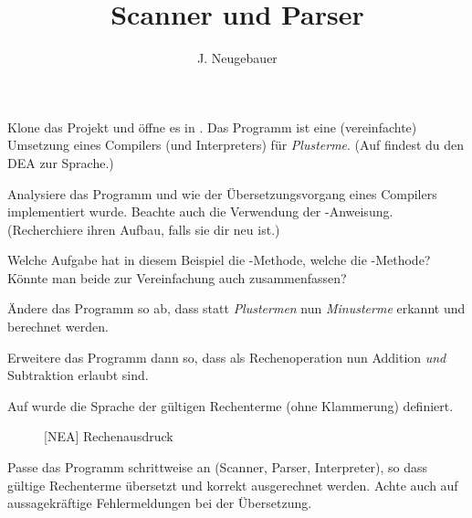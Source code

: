 \documentclass[10pt, a4paper]{scrartcl}
\author{J. Neugebauer}
\title{Scanner und Parser}
\date{\Heute}
\begin{document}
\ReiheTitel

\begin{aufgabe}[subtitle=Funktionsweise eines Compilers]
	\label{aufg:compiler}
	Klone das Projekt  und öffne es in .
	Das Programm ist eine (vereinfachte) Umsetzung eines Compilers (und Interpreters) für
	\emph{Plusterme}. (Auf  findest du den DEA zur Sprache.)

	Analysiere das Programm und wie der Übersetzungsvorgang eines Compilers
	implementiert wurde. Beachte auch die Verwendung der -Anweisung. (Recherchiere
	ihren Aufbau, falls sie dir neu ist.)

	Welche Aufgabe hat in diesem Beispiel die -Methode, welche die -Methode?
	Könnte man beide zur Vereinfachung auch zusammenfassen?

\end{aufgabe}

\begin{aufgabe}[subtitle=Minusterme]
	\label{aufg:subtraktion}
	Ändere das Programm so ab, dass statt \emph{Plustermen} nun \emph{Minusterme} erkannt und
	berechnet werden.

	Erweitere das Programm dann so, dass als Rechenoperation nun Addition \emph{und}
	Subtraktion erlaubt sind.
\end{aufgabe}

\begin{aufgabe}[subtitle=Rechenterme]
	\label{aufg:subtraktion}
	Auf  wurde die Sprache der gültigen Rechenterme (ohne Klammerung) definiert.

	\begin{figure}[h]
		\centering
		\begin{transitiongraph}[fa]

		\end{transitiongraph}
		\caption{[NEA] Rechenausdruck}
		\label{graph:[NEA]_Rechenausdruck}
	\end{figure}

	Passe das Programm schrittweise an (Scanner, Parser, Interpreter), so dass gültige Rechenterme
	übersetzt und korrekt ausgerechnet werden. Achte auch auf aussagekräftige Fehlermeldungen bei der
	Übersetzung.

\end{aufgabe}
\end{document}
